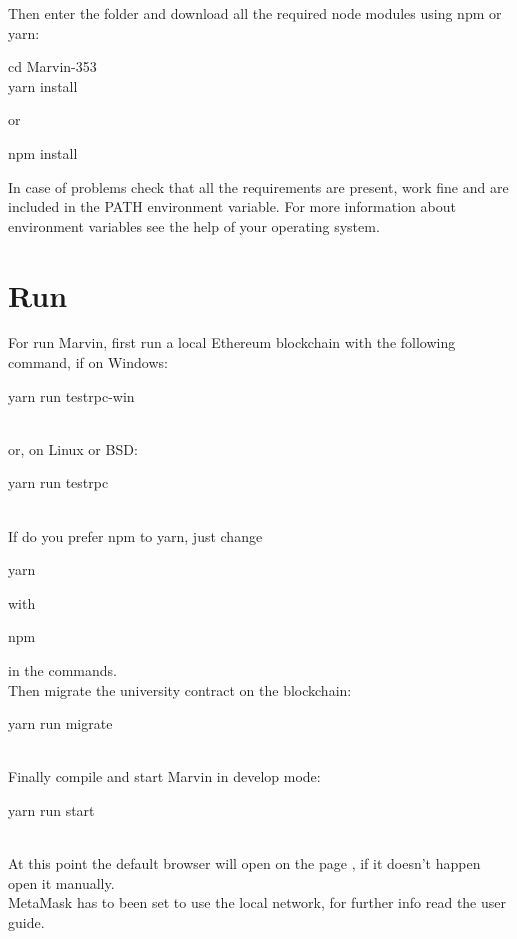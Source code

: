 \documentclass[ManualeSviluppatore.tex]{subfiles}
\begin{document}
Then enter the folder and download all the required node modules using npm or yarn: \\
\begin{ttfamily}
	cd Marvin-353 \\
	yarn install \\
\end{ttfamily}
or \\
\begin{ttfamily}
npm install \\
\end{ttfamily}

In case of problems check that all the requirements are present, work fine and are included in the PATH environment variable. For more information about environment variables see the help of your operating system. \\


\section{Run}
For run Marvin, first run a local Ethereum blockchain with the following command, if on Windows: \\
\begin{ttfamily} yarn run testrpc-win \end{ttfamily} \\
or, on Linux or BSD: \\
\begin{ttfamily} yarn run testrpc \end{ttfamily} \\
If do you prefer npm to yarn, just change \begin{ttfamily}yarn\end{ttfamily}  with \begin{ttfamily}npm\end{ttfamily} in the commands.\\

Then migrate the university contract on the blockchain: \\
\begin{ttfamily} yarn run migrate \end{ttfamily} \\
Finally compile and start Marvin in develop mode: \\
\begin{ttfamily} yarn run start \end{ttfamily} \\

At this point the default browser will open on the page , if it doesn't happen open it manually.\\
MetaMask has to been set to use the local network, for further info read the user guide.
\end{document}
